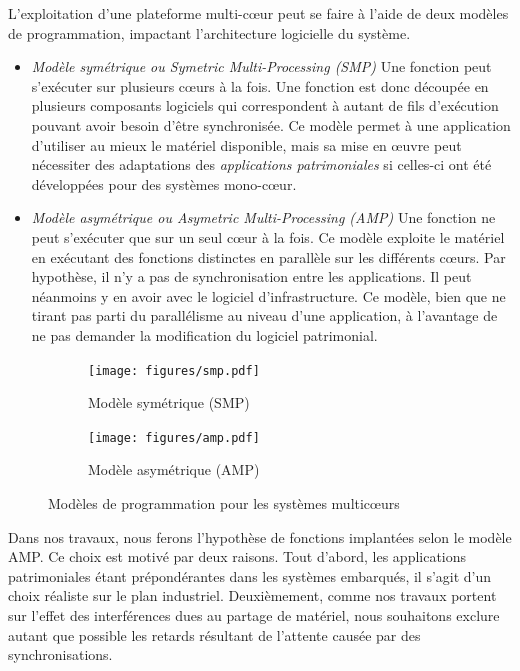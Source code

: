 L'exploitation d'une plateforme multi-cœur peut se faire à l'aide de deux modèles de programmation, impactant l'architecture logicielle du système.
\begin{itemize}
	\item \emph{Modèle symétrique ou Symetric Multi-Processing (SMP)} Une fonction peut s'exécuter sur plusieurs cœurs à la fois.
	Une fonction est donc découpée en plusieurs composants logiciels qui correspondent à autant de fils d'exécution pouvant avoir besoin d'être synchronisée.
	Ce modèle permet à une application d'utiliser au mieux le matériel disponible, mais sa mise en œuvre peut nécessiter des adaptations des \emph{applications patrimoniales} si celles-ci ont été développées pour des systèmes mono-cœur.

	\item \emph{Modèle asymétrique ou Asymetric Multi-Processing (AMP)} Une fonction ne peut s'exécuter que sur un seul cœur à la fois.
	Ce modèle exploite le matériel en exécutant des fonctions distinctes en parallèle sur les différents cœurs.
	Par hypothèse, il n'y a pas de synchronisation entre les applications.
	Il peut néanmoins y en avoir avec le logiciel d'infrastructure.
	Ce modèle, bien que ne tirant pas parti du parallélisme au niveau d'une application, à l'avantage de ne pas demander la modification du logiciel patrimonial.
\end{itemize}

\begin{figure}[!h]
	\centering
	\begin{subfigure}[b]{0,35\linewidth}
		\texttt{[image: figures/smp.pdf]}
		\caption{\label{fig:smp} Modèle symétrique (SMP)}
	\end{subfigure}
	\begin{subfigure}[b]{0,35\linewidth}
		\texttt{[image: figures/amp.pdf]}
		\caption{\label{fig:amp} Modèle asymétrique (AMP)}
	\end{subfigure}
	\caption{\label{fig:amp-smp} Modèles de programmation pour les systèmes multicœurs}
\end{figure}

Dans nos travaux, nous ferons l'hypothèse de fonctions implantées selon le modèle AMP. 
Ce choix est motivé par deux raisons.
Tout d'abord, les applications patrimoniales étant prépondérantes dans les systèmes embarqués, il s'agit d'un choix réaliste sur le plan industriel.
Deuxièmement, comme nos travaux portent sur l'effet des interférences dues au partage de matériel, nous souhaitons exclure autant que possible les retards résultant de l'attente causée par des synchronisations.

